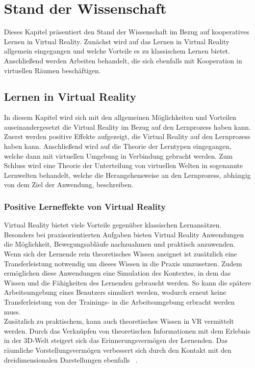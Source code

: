 \section{Stand der Wissenschaft} \label{Wissenschaft}
Dieses Kapitel präsentiert den Stand der Wissenschaft im Bezug auf kooperatives Lernen in Virtual Reality. Zunächst wird auf das Lernen in Virtual Reality allgemein eingegangen und welche Vorteile es zu klassischem Lernen bietet. Anschließend werden Arbeiten behandelt, die sich ebenfalls mit Kooperation in virtuellen Räumen beschäftigen.

\subsection{Lernen in Virtual Reality}
In diesem Kapitel wird sich mit den allgemeinen Möglichkeiten und Vorteilen auseinandergesetzt die Virtual Reality im Bezug auf den Lernprozess haben kann. Zuerst werden positive Effekte aufgezeigt, die Virtual Reality auf den Lernprozess haben kann. Anschließend wird auf die Theorie der Lerntypen eingegangen, welche dann mit virtuellen Umgebung in Verbindung gebracht werden. Zum Schluss wird eine Theorie der Unterteilung von virtuellen Welten in sogenannte Lernwelten behandelt, welche die Herangehensweise an den Lernprozess, abhängig von dem Ziel der Anwendung, beschreiben.

\subsubsection{Positive Lerneffekte von Virtual Reality}
Virtual Reality bietet viele Vorteile gegenüber klassischen Lernansätzen. Besonders bei praxisorientierten Aufgaben bieten Virtual Reality Anwendungen die Möglichkeit, Bewegungsabläufe nachzuahmen und praktisch anzuwenden. Wenn sich der Lernende rein theoretisches Wissen aneignet ist zusätzlich eine Transferleistung notwendig um dieses Wissen in die Praxis umzusetzen. Zudem ermöglichen diese Anwendungen eine Simulation des Kontextes, in dem das Wissen und die Fähigkeiten des Lernenden gebraucht werden. So kann die spätere Arbeitsumgebung eines Benutzers simuliert werden, wodurch erneut keine Transferleistung von der Trainings- in die Arbeitsumgebung erbracht werden muss.\\

Zusätzlich zu praktischem, kann auch theoretisches Wissen in VR vermittelt werden. Durch das Verknüpfen von theoretischen Informationen mit dem Erlebnis in der 3D-Welt steigert sich das Erinnerungsvermögen der Lernenden. Das räumliche Vorstellungsvermögen verbessert sich durch den Kontakt mit den dreidimensionalen Darstellungen ebenfalls ~\parencite{Buehler2020}.\\

